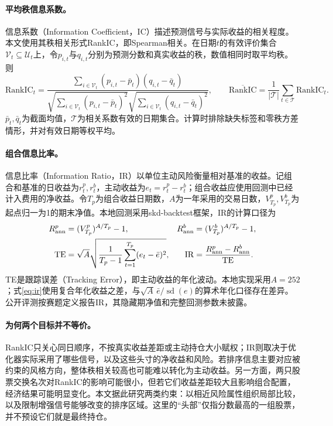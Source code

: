 \documentclass[UTF8,11pt,a4paper,fontset=fandol]{ctexart}
\begin{document}
\paragraph{平均秩信息系数。}
信息系数（Information Coefficient，IC）描述预测信号与实际收益的相关程度。本文使用其秩相关形式RankIC，即Spearman相关\cite{competition}。在日期$t$的有效评价集合$\mathcal V_t\subseteq\mathcal U_t$上，令$p_{i,t}$与$q_{i,t}$分别为预测分数和真实收益的秩，数值相同时取平均秩。则
\begin{equation}
 \mathrm{RankIC}_t=
 \frac{\sum_{i\in\mathcal V_t}(p_{i,t}-\bar p_t)(q_{i,t}-\bar q_t)}
 {\sqrt{\sum_{i\in\mathcal V_t}(p_{i,t}-\bar p_t)^2}
  \sqrt{\sum_{i\in\mathcal V_t}(q_{i,t}-\bar q_t)^2}},\qquad
 \overline{\mathrm{RankIC}}=\frac{1}{|\mathcal T|}\sum_{t\in\mathcal T}\mathrm{RankIC}_t.
 \label{eq:rankic}
\end{equation}
$\bar p_t,\bar q_t$为截面均值，$\mathcal T$为相关系数有效的日期集合。计算时排除缺失标签和零秩方差情形，并对有效日期等权平均。

\paragraph{组合信息比率。}
信息比率（Information Ratio，IR）以单位主动风险衡量相对基准的收益。记组合和基准的日收益为$r^p_t,r^b_t$，主动收益为$e_t=r^p_t-r^b_t$；组合收益应使用回测中已经计入费用的净收益。令$T_p$为组合收益日期数，$A$为一年采用的交易日数，$V^p_{T_p},V^b_{T_p}$为起点归一为1的期末净值。本地回测采用skd-backtest框架\cite{skdbacktest}，IR的计算口径为
\begin{align}
 R^p_{\rm ann}&=(V^p_{T_p})^{A/T_p}-1,
 &R^b_{\rm ann}&=(V^b_{T_p})^{A/T_p}-1,\notag\\
 \mathrm{TE}&=\sqrt{A}\sqrt{\frac{1}{T_p-1}\sum_{t=1}^{T_p}(e_t-\bar e)^2},
 &\mathrm{IR}&=\frac{R^p_{\rm ann}-R^b_{\rm ann}}{\mathrm{TE}}.
 \label{eq:ir}
\end{align}
TE是跟踪误差（Tracking Error），即主动收益的年化波动。本地实现采用$A=252$；式\eqref{eq:ir}使用复合年化收益之差，与$\sqrt A\,\bar e/\operatorname{sd}(e)$的算术年化口径存在差异。公开评测按赛题定义报告IR\cite{competition}，其隐藏期净值和完整回测参数未披露。

\paragraph{为何两个目标并不等价。}
RankIC只关心同日顺序，不按真实收益差距或主动持仓大小赋权；IR则取决于优化器实际采用了哪些信号，以及这些头寸的净收益和风险。若排序信息主要对应被约束的风格方向，整体秩相关较高也可能难以转化为主动收益。另一方面，两只股票交换名次对RankIC的影响可能很小，但若它们收益差距较大且影响组合配置，经济结果可能明显变化。本文据此研究两类约束：以相近风险属性组织局部比较，以及限制增强信号能够改变的排序区域。这里的“头部”仅指分数最高的一组股票，并不预设它们就是最终持仓。
\end{document}
